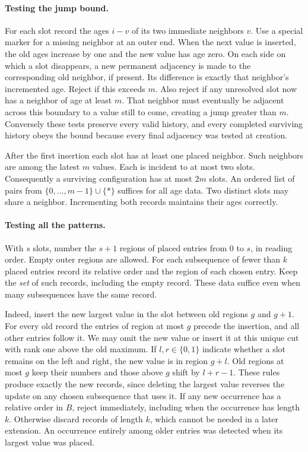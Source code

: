 \documentclass[11pt]{article}
\begin{document}
\paragraph{Testing the jump bound.}
For each slot record the ages $i-v$ of its two immediate neighbors $v$. Use a special marker for a missing neighbor at an outer end. When the next value is inserted, the old ages increase by one and the new value has age zero. On each side on which a slot disappears, a new permanent adjacency is made to the corresponding old neighbor, if present. Its difference is exactly that neighbor's incremented age. Reject if this exceeds $m$. Also reject if any unresolved slot now has a neighbor of age at least $m$. That neighbor must eventually be adjacent across this boundary to a value still to come, creating a jump greater than $m$. Conversely these tests preserve every valid history, and every completed surviving history obeys the bound because every final adjacency was tested at creation.

After the first insertion each slot has at least one placed neighbor. Such neighbors are among the latest $m$ values. Each is incident to at most two slots. Consequently a surviving configuration has at most $2m$ slots. An ordered list of pairs from $\{0,\ldots,m-1\}\cup\{*\}$ suffices for all age data. Two distinct slots may share a neighbor. Incrementing both records maintains their ages correctly.

\paragraph{Testing all the patterns.}
With $s$ slots, number the $s+1$ regions of placed entries from $0$ to $s$, in reading order. Empty outer regions are allowed. For each subsequence of fewer than $k$ placed entries record its relative order and the region of each chosen entry. Keep the \emph{set} of such records, including the empty record. These data suffice even when many subsequences have the same record.

Indeed, insert the new largest value in the slot between old regions $g$ and $g+1$. For every old record the entries of region at most $g$ precede the insertion, and all other entries follow it. We may omit the new value or insert it at this unique cut with rank one above the old maximum. If $l,r\in\{0,1\}$ indicate whether a slot remains on the left and right, the new value is in region $g+l$. Old regions at most $g$ keep their numbers and those above $g$ shift by $l+r-1$. These rules produce exactly the new records, since deleting the largest value reverses the update on any chosen subsequence that uses it. If any new occurrence has a relative order in $B$, reject immediately, including when the occurrence has length $k$. Otherwise discard records of length $k$, which cannot be needed in a later extension. An occurrence entirely among older entries was detected when its largest value was placed.
\end{document}
